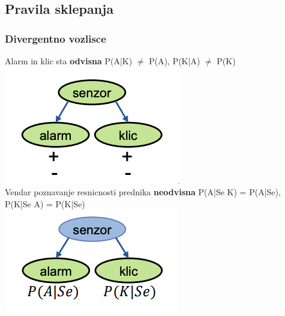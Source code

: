 \subsection{Pravila sklepanja}
\subsubsection{Divergentno vozlisce}
Alarm in klic sta \textbf{odvisna} P(A|K) $\neq$ P(A), P(K|A) $\neq$ P(K)\\
\includegraphics[width=\columnwidth]{images/bayes-divergentno.png}\\
Vendar poznavanje resnicnosti prednika \textbf{neodvisna} P(A|Se K) = P(A|Se), P(K|Se A) = P(K|Se)\\
\includegraphics[width=\columnwidth]{images/bayes-divergentno2.png}


